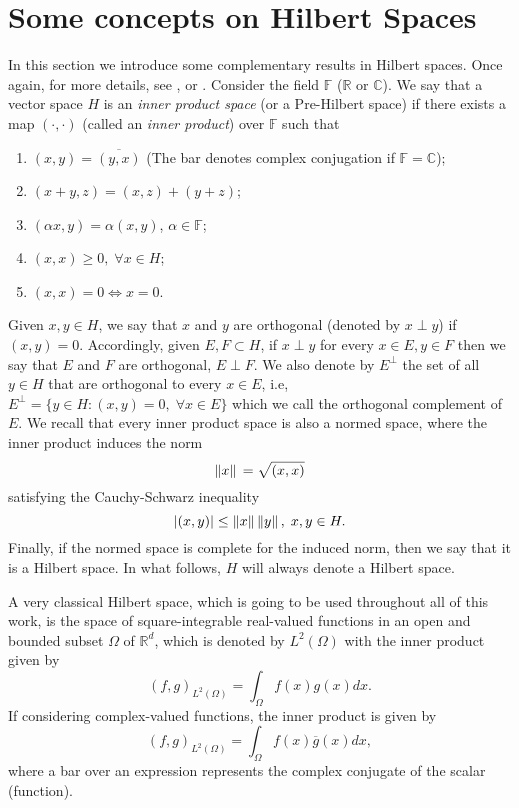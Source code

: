 \section{Some concepts on Hilbert Spaces}
In this section we introduce some complementary results in Hilbert spaces. Once again, for more details, see \cite{rudin1991functional}, \cite{brezis2011functional} or \cite{arendt2010partielle}. Consider the field \(\mathbb{F}\) (\(\mathbb{R}\) or \(\mathbb{C}\)). We say that a vector space \(H\) is an \textit{inner product space} (or a Pre-Hilbert space) if there exists a map \((\cdot,\cdot)\) (called an \textit{inner product}) over \(\mathbb{F}\) such that
\begin{enumerate}
    \item \((x, y) = \overline{(y, x)}\) (The bar denotes complex conjugation if \(\mathbb{F} = \mathbb{C}\));
    \item \((x+y,z) = (x,z)+(y+z)\);
    \item \((\alpha x, y)=\alpha(x, y)\), \(\alpha \in \mathbb{F}\);
    \item \((x, x) \geq 0, \; \forall x \in H\);
    \item \((x, x) = 0 \iff x=0\).
\end{enumerate}
Given \(x, y \in H\), we say that \(x\) and \(y\) are orthogonal (denoted by \(x \perp y\)) if \((x, y) = 0\). Accordingly, given \(E, F \subset H\), if \(x\perp y\) for every \(x \in E, y \in F\) then we say that \(E\) and \(F\) are orthogonal, \(E \perp F\). We also denote by \(E^\perp\) the set of all \(y \in H\) that are orthogonal to every \(x \in E\), i.e, \(E^\perp = \{y \in H: (x, y)=0, \; \forall x \in E\}\) which we call the orthogonal complement of \(E\). We recall that every inner product space is also a normed space, where the inner product induces the norm
\[
\norm*{x} = \sqrt{(x, x)}   
\]
satisfying the Cauchy-Schwarz inequality
\[
\abs{(x, y)} \leq \norm*{x}\norm*{y}, \; x, y \in H.
\]
Finally, if the normed space is complete for the induced norm, then we say that it is a Hilbert space. In what follows, \(H\) will always denote a Hilbert space.
\begin{example}
    A very classical Hilbert space, which is going to be used throughout all of this work, is the space of square-integrable real-valued functions in an open and bounded subset \(\Omega\) of \(\mathbb{R}^d\), which is denoted by \(L^2(\Omega)\) with the inner product given by
    \[
    (f, g)_{L^2(\Omega)} = \int_\Omega f(x)g(x) dx.
    \]
    If considering complex-valued functions, the inner product is given by
    \[
        (f, g)_{L^2(\Omega)} = \int_\Omega f(x)\overline{g}(x) dx,
    \]
    where a bar over an expression represents the complex conjugate of the scalar (function).
\end{example}
